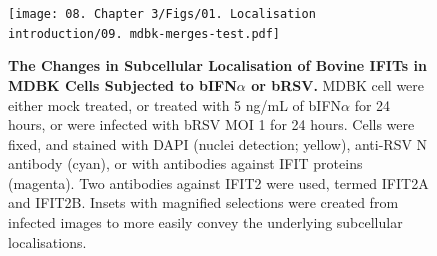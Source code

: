 \begin{figure}
    \centering
    \texttt{[image: 08. Chapter 3/Figs/01. Localisation introduction/09. mdbk-merges-test.pdf]}
    \caption[The Changes in Subcellular Localisation of Bovine IFITs in MDBK Cells Subjected to bIFN\(\alpha\) or bRSV.]{\textbf{The Changes in Subcellular Localisation of Bovine IFITs in MDBK Cells Subjected to bIFN\(\alpha\) or bRSV.} MDBK cell were either mock treated, or treated with 5 ng/mL of bIFN\(\alpha\) for 24 hours, or were infected with bRSV MOI 1 for 24 hours. Cells were fixed, and stained with DAPI (nuclei detection; yellow), anti-RSV N antibody (cyan), or with antibodies against IFIT proteins (magenta). Two antibodies against IFIT2 were used, termed IFIT2A and IFIT2B. Insets with magnified selections were created from infected images to more easily convey the underlying subcellular localisations.}
    \label{fig:The Changes in Subcellular Localisation of Bovine IFITs in MDBK Cells Subjected to bIFNa or bRSV}
\end{figure}

